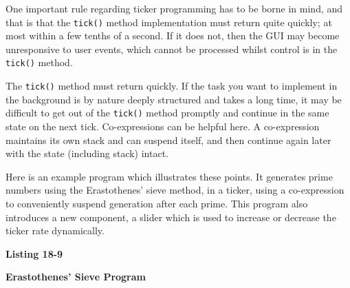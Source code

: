 One important rule regarding ticker programming has to be borne in mind,
and that is that the \texttt{tick()} method implementation must return
quite quickly; at most within a few tenths of a second. If it does
not, then the GUI may become unresponsive to user events, which cannot
be processed whilst control is in the \texttt{tick()} method.

The \texttt{tick()} method must return quickly. If the
task you want to implement in the background is by nature deeply
structured and takes a long time, it may be difficult
to get out of the \texttt{tick()} method promptly and continue in the
same state on the next tick.  Co-expressions can
be helpful here. A co-expression
maintains its own stack and can suspend itself, and then
continue again later with the state (including stack) intact.

Here is an example program which illustrates these points. It
generates prime numbers using the Erastothenes' sieve
method, in a ticker, using a co-expression to conveniently suspend
generation after each prime.
This program also introduces a new component, a slider which is
used to increase or decrease the ticker rate dynamically.

{\sffamily\bfseries
Listing 18-9}

{\sffamily\bfseries
Erastothenes' Sieve Program}

